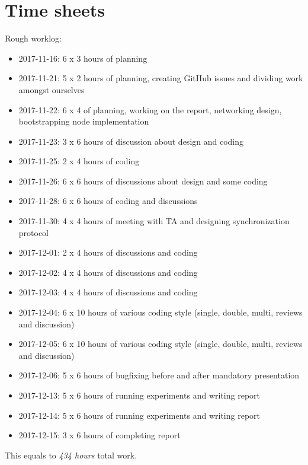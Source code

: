 \documentclass[a4paper]{article}
\begin{document}
\section{Time sheets}
Rough worklog:
\begin{itemize}
\item 2017-11-16: 6 x 3 hours of planning
\item 2017-11-21: 5 x 2 hours of planning, creating GitHub issues and dividing work amongst ourselves
\item 2017-11-22: 6 x 4 of planning, working on the report, networking design, bootstrapping node implementation
\item 2017-11-23: 3 x 6 hours of discussion about design and coding
\item 2017-11-25: 2 x 4 hours of coding
\item 2017-11-26: 6 x 6 hours of discussions about design and some coding
\item 2017-11-28: 6 x 6 hours of coding and discussions
\item 2017-11-30: 4 x 4 hours of meeting with TA and designing synchronization protocol
\item 2017-12-01: 2 x 4 hours of discussions and coding
\item 2017-12-02: 4 x 4 hours of discussions and coding
\item 2017-12-03: 4 x 4 hours of discussions and coding
\item 2017-12-04: 6 x 10 hours of various coding style (single, double, multi, reviews and discussion)
\item 2017-12-05: 6 x 10 hours of various coding style (single, double, multi, reviews and discussion)
\item 2017-12-06: 5 x 6 hours of bugfixing before and after mandatory presentation
\item 2017-12-13: 5 x 6 hours of running experiments and writing report
\item 2017-12-14: 5 x 6 hours of running experiments and writing report
\item 2017-12-15: 3 x 6 hours of completing report
\end{itemize}

This equals to \emph{434 hours} total work.
\end{document}
